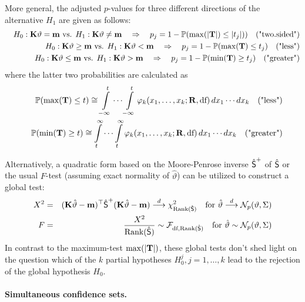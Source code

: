 \documentclass[12pt]{article}
\begin{document}
More general, the adjusted $p$-values for three different
directions of the alternative $H_1$ are given as follows:
\begin{eqnarray*}
& & H_0: \K \vartheta = \m \text{ vs. } H_1: \K \vartheta \not = \m \quad \Rightarrow \quad p_j  =  1 - \Prob(\max(|\T|) \le
|t_j|)) \quad \text{("two.sided")} \\
& & H_0: \K \vartheta \ge \m \text{ vs. } H_1: \K \vartheta < \m  \quad \Rightarrow \quad p_j  =  1 - \Prob(\max(\T) \le
t_j) \quad \text{("less")} \\
& & H_0: \K \vartheta \le \m \text{ vs. } H_1: \K \vartheta > \m \quad \Rightarrow \quad p_j  =  1 - \Prob(\min(\T) \ge
t_j) \quad \text{("greater")}
\end{eqnarray*}
where the latter two probabilities are calculated as 
\begin{eqnarray*}
& & \Prob(\max(\T) \le t)  \cong\int\limits_{-\infty}^t \cdots \int\limits_{-\infty}^t 
\varphi_k(x_1, \dots, x_k; \Cor, \text{df}) \, dx_1 \cdots dx_k \quad \text{("less")}\\
& & \Prob(\min(\T) \ge t) \cong  \int\limits_{t}^\infty \cdots \int\limits_{t}^\infty \varphi_k(x_1, \dots, x_k; \Cor, \text{df}) \, dx_1 \cdots dx_k \quad \text{("greater")}\\
\end{eqnarray*}



Alternatively, a quadratic form based on the Moore-Penrose inverse $\hat{\S}^+$ of 
$\hat{\S}$ or the usual $F$-test (assuming exact normality of $\hat{\vartheta}$) 
can be utilized to construct a global test:
\begin{eqnarray*}
X^2 & = & (\K \hat{\vartheta} - \m)^\top \hat{\S}^+ (\K \hat{\vartheta} - \m) \cL \chi^2_{\Rg(\hat{\S})} 
\quad \text{for } \hat{\vartheta} \cL \N_p(\vartheta, \Sigma) \\
F & = &  \frac{X^2}{\Rg(\hat{\S})} \sim \F_{\text{df}, \Rg(\hat{\S})} \quad \text{for } \hat{\vartheta} \sim \N_p(\vartheta, \Sigma)
\end{eqnarray*}
In contrast to the maximum-test $\max(|\T|)$, these global tests don't shed light 
on the question which of the $k$ partial hypotheses $H_0^j, j = 1, \dots, k$ 
lead to the rejection of the global hypothesis $H_0$. 

\paragraph{Simultaneous confidence sets.}
\end{document}

